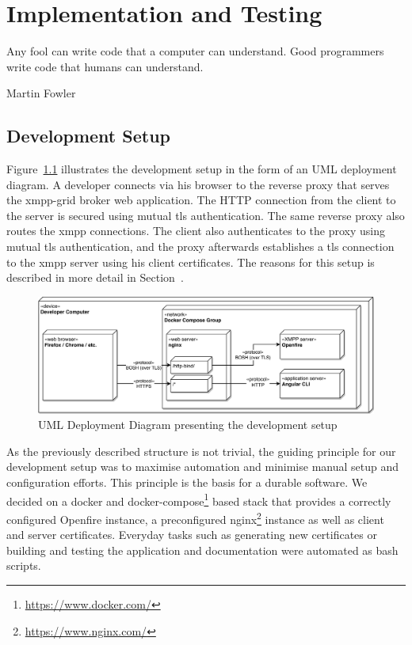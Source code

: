 \chapter{Implementation and Testing} %
\epigraph{Any fool can write code that a computer can understand. Good programmers write code that humans can understand.}{Martin Fowler}


\section{Development Setup}\label{sec:development-setup}

Figure~\ref{fig:development-setup} illustrates the development setup in the form of an UML deployment diagram.
A developer connects via his browser to the reverse proxy that serves the \gls{xmpp-grid} \gls{broker} web application.
The HTTP connection from the client to the server is secured using mutual \gls{tls} authentication.
The same reverse proxy also routes the \gls{xmpp} connections.
The client also authenticates to the proxy using mutual \gls{tls} authentication, and the proxy afterwards establishes a \gls{tls} connection to the \gls{xmpp} server using his client certificates.
The reasons for this setup is described in more detail in Section~.

\begin{figure}[h]
    \centering
    \includegraphics[width=1\linewidth]{resources/development-setup-uml}
    \caption{UML Deployment Diagram presenting the development setup}
    \label{fig:development-setup}
\end{figure}

As the previously described structure is not trivial, the guiding principle for our development setup was to maximise automation and minimise manual setup and configuration efforts. This principle is the basis for a durable software.
We decided on a docker and docker-compose\footnote{\url{https://www.docker.com/}} based stack that provides a correctly configured Openfire instance, a preconfigured nginx\footnote{\url{https://www.nginx.com/}} instance as well as client and server certificates.
Everyday tasks such as generating new certificates or building and testing the application and documentation were automated as bash scripts.

